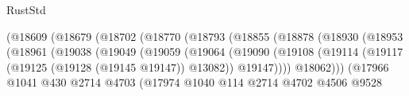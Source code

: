 \begin{lexlean}{RustStd}
\begin{coremodule}
{\begin{coremodule}
{{{{{{{{{{{{{{{{{{{{{{{{{{{{{{{{{{{{{{{                                            (@18609
                                              (@18679
                                                (@18702
                                                  (@18770
                                                    (@18793
                                                      (@18855
                                                        (@18878
                                                          (@18930
                                                            (@18953
                                                              (@18961
                                                                (@19038
                                                                  (@19049
                                                                    (@19059
                                                                      (@19064
                                                                        (@19090
                                                                          (@19108
                                                                            (@19114
                                                                              (@19117
                                                                                (@19125
                                                                                  (@19128
                                                                                    (@19145 @19147))
                                                                                  @13082))
                                                                              @19147))))
                                                                      @18062)))
                                                                (@17966
                                                                  @1041
                                                                  @430
                                                                  @2714
                                                                  @4703
                                                                  (@17974
                                                                    @1040
                                                                    @114
                                                                    @2714
                                                                    @4702
                                                                    @4506
                                                                    @9528
}}}}}}}}}}}}}}}}}}}}}}}}}}}}}}}}}}}}}}}
\end{coremodule}}
\end{coremodule}
\end{lexlean}
